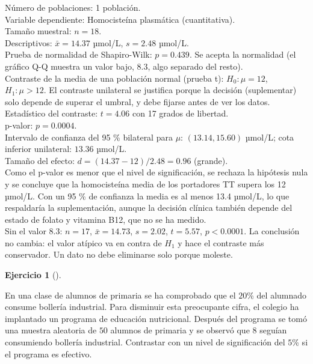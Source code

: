 \documentclass[
  spanish,
  a4paper,
]{scrreport}
\theoremstyle{definition}
\newtheorem{exercise}{Ejercicio}[chapter]
\theoremstyle{remark}
\begin{document}
\begin{tcolorbox}[enhanced jigsaw, arc=.35mm, bottomrule=.15mm, bottomtitle=1mm, breakable, colback=white, colbacktitle=quarto-callout-tip-color!10!white, colframe=quarto-callout-tip-color-frame, coltitle=black, left=2mm, leftrule=.75mm, opacityback=0, opacitybacktitle=0.6, rightrule=.15mm, title=\textcolor{quarto-callout-tip-color}{\faLightbulb}\hspace{0.5em}{Solución}, titlerule=0mm, toprule=.15mm, toptitle=1mm]

Número de poblaciones: 1 población.\\
Variable dependiente: Homocisteína plasmática (cuantitativa).\\
Tamaño muestral: \(n=18\).\\
Descriptivos: \(\bar x=14.37\) µmol/L, \(s=2.48\) µmol/L.\\
Prueba de normalidad de Shapiro-Wilk: \(p=0.439\). Se acepta la
normalidad (el gráfico Q-Q muestra un valor bajo, 8.3, algo separado del
resto).\\
Contraste de la media de una población normal (prueba t):
\(H_0:\mu=12\), \(H_1:\mu>12\). El contraste unilateral se justifica
porque la decisión (suplementar) solo depende de superar el umbral, y
debe fijarse antes de ver los datos.\\
Estadístico del contraste: \(t=4.06\) con 17 grados de libertad.\\
p-valor: \(p=0.0004\).\\
Intervalo de confianza del 95 \% bilateral para \(\mu\):
\((13.14, 15.60)\) µmol/L; cota inferior unilateral: \(13.36\) µmol/L.\\
Tamaño del efecto: \(d=(14.37-12)/2.48=0.96\) (grande).\\
Como el p-valor es menor que el nivel de significación, se rechaza la
hipótesis nula y se concluye que la homocisteína media de los portadores
TT supera los 12 µmol/L. Con un 95 \% de confianza la media es al menos
13.4 µmol/L, lo que respaldaría la suplementación, aunque la decisión
clínica también depende del estado de folato y vitamina B12, que no se
ha medido.\\
Sin el valor 8.3: \(n=17\), \(\bar x=14.73\), \(s=2.02\), \(t=5.57\),
\(p<0.0001\). La conclusión no cambia: el valor atípico va en contra de
\(H_1\) y hace el contraste más conservador. Un dato no debe eliminarse
solo porque moleste.

\end{tcolorbox}

\begin{exercise}[]\protect\hypertarget{exr-contraste-proporcion-bolleria-industrial}{}\label{exr-contraste-proporcion-bolleria-industrial}

En una clase de alumnos de primaria se ha comprobado que el \(20\)\% del
alumnado consume bollería industrial. Para disminuir esta preocupante
cifra, el colegio ha implantado un programa de educación nutricional.
Después del programa se tomó una muestra aleatoria de \(50\) alumnos de
primaria y se observó que 8 seguían consumiendo bollería industrial.
Contrastar con un nivel de significación del \(5\)\% si el programa es
efectivo.

\end{exercise}
\end{document}
